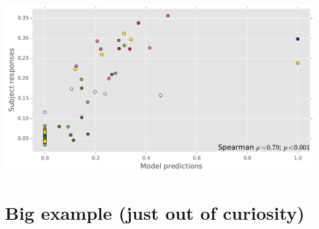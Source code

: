 \documentclass{article}
\begin{document}
\begin{examples}
  \includegraphics[width=1\textwidth]{fig/experiment-scatterplot-speakernorm.pdf}
\end{examples}

\newpage


\section{Big example (just out of curiosity)}
\end{document}
